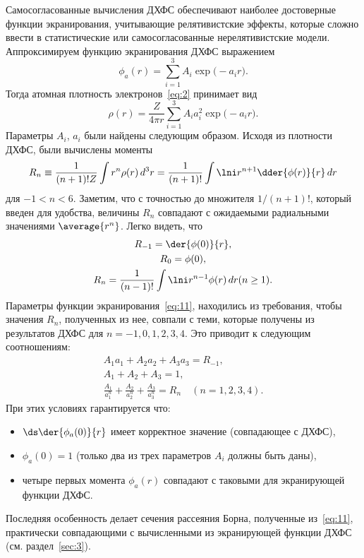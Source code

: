 \documentclass[10pt,pscyr]{hedlab}
\newcommand{\eq}  [1]{\eqref{eq:#1}}
\newcommand{\sect}[1]{\ref{sec:#1}}
\begin{document}
  Самосогласованные вычисления ДХФС обеспечивают наиболее достоверные функции
  экранирования, учитывающие релятивистские эффекты, которые сложно ввести в
  статистические или самосогласованные нерелятивистские модели. Аппроксимируем
  функцию экранирования ДХФС выражением
  \begin{equation}
    \phi_a(r) = \sum_{i=1}^3 A_i\exp\bigl(-a_i r\big).
    \label{eq:11}
  \end{equation}
  Тогда атомная плотность электронов~\eq{2} принимает вид
  \begin{equation}
    \rho(r) = \frac{Z}{4\pi r} \sum_{i=1}^3 A_i a_i^2\exp\bigl(-a_i r\big).
    \label{eq:12}
  \end{equation}
  Параметры \( A_i \), \( a_i \) были найдены следующим образом. Исходя из
  плотности ДХФС, были вычислены моменты
  \begin{equation}
    R_n \equiv \frac{1}{(n + 1)! Z} \int r^n \rho(r)\,d^3r =
      \frac{1}{(n + 1)!} \int\lni r^{n+1}\dder{\phi(r)}{r}\,dr
    \label{eq:13}
  \end{equation}
  для \( -1 < n < 6 \). Заметим, что с точностью до множителя
  \( 1 / (n + 1)! \), который введен для удобства, величины \( R_n \) совпадают
  с ожидаемыми радиальными значениями \( \average{r^n} \). Легко видеть, что
  \begin{gather*}
    R_{-1} = \der{\phi(0)}{r}, \\
    R_0 = \phi(0), \\
    R_n = \frac{1}{(n - 1)!} \int\lni r^{n-1} \phi(r)\,dr (n \ge 1).
  \end{gather*}
  Параметры функции экранирования~\eq{11}, находились из требования,
  чтобы значения \( R_n \), полученных из нее, совпали с теми, которые
  получены из результатов ДХФС для \( n = -1, 0, 1, 2, 3, 4 \). Это приводит к
  следующим соотношениям:
  \begin{gather}
    A_1 a_1 + A_2 a_2 + A_3 a_3 = R_{-1}, \nonumber \\
    A_1 + A_2 + A_3 = 1, \label{eq:15} \\
    \frac{A_1}{a_1^n} + \frac{A_2}{a_2^n} + \frac{A_3}{a_3^n} = R_n \quad
      (n = 1, 2, 3, 4). \nonumber
  \end{gather}
  При этих условиях гарантируется что:
  \begin{itemize}
    \item \( \ds \der{\phi_a(0)}{r} \) имеет корректное значение
      (совпадающее с ДХФС),
    \item \( \phi_a(0) = 1 \) (только два из трех параметров \( A_i \) должны
      быть даны),
    \item четыре первых момента \( \phi_a(r) \) совпадают с таковыми для
      экранирующей функции ДХФС.
  \end{itemize}
  Последняя особенность делает сечения рассеяния Борна, полученные
  из~\eq{11}, практически совпадающими с вычисленными из экранирующей
  функции ДХФС (см. раздел~\sect{3}).
  
\end{document}
